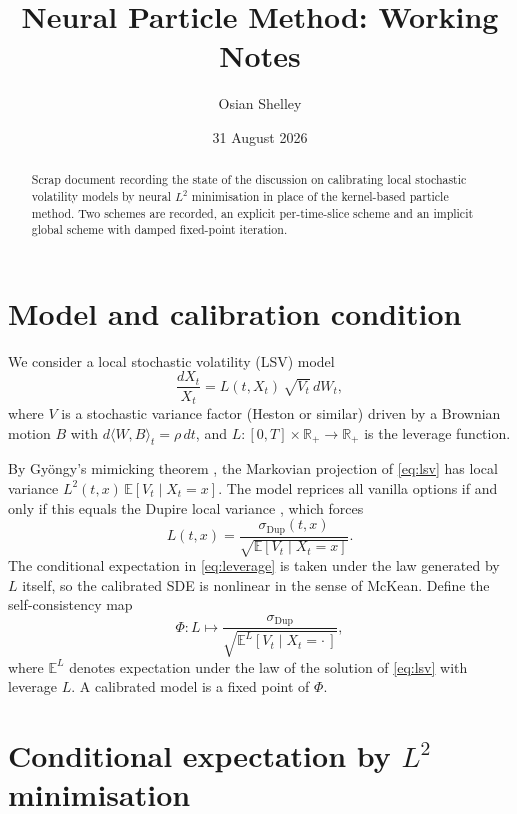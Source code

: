 \documentclass[11pt,a4paper]{article}
\title{Neural Particle Method: Working Notes}
\author{Osian Shelley}
\date{31 August 2026}
\theoremstyle{plain}
\theoremstyle{definition}
\theoremstyle{definition}
\newcommand{\E}{\mathbb{E}}
\newcommand{\R}{\mathbb{R}}
\newcommand{\sigDup}{\sigma_{\mathrm{Dup}}}
\newcommand{\Lev}{L}
\newcommand{\Phimap}{\Phi}
\begin{document}
\maketitle

\begin{abstract}
Scrap document recording the state of the discussion on calibrating local stochastic volatility models by neural $L^2$ minimisation in place of the kernel-based particle method. Two schemes are recorded, an explicit per-time-slice scheme and an implicit global scheme with damped fixed-point iteration.
\end{abstract}

\section{Model and calibration condition}\label{sec:setup}

We consider a local stochastic volatility (LSV) model
\begin{equation}\label{eq:lsv}
  \frac{dX_t}{X_t} = \Lev(t, X_t)\,\sqrt{V_t}\,dW_t,
\end{equation}
where $V$ is a stochastic variance factor (Heston or similar) driven by a Brownian motion $B$ with $d\langle W, B\rangle_t = \rho\,dt$, and $\Lev\colon [0,T]\times\R_+ \to \R_+$ is the leverage function.

By Gy\"ongy's mimicking theorem \citep{gyongy1986}, the Markovian projection of \cref{eq:lsv} has local variance $\Lev^2(t,x)\,\E[V_t \mid X_t = x]$. The model reprices all vanilla options if and only if this equals the Dupire local variance \citep{dupire1994}, which forces
\begin{equation}\label{eq:leverage}
  \Lev(t,x) = \frac{\sigDup(t,x)}{\sqrt{\E[V_t \mid X_t = x]}}.
\end{equation}
The conditional expectation in \cref{eq:leverage} is taken under the law generated by $\Lev$ itself, so the calibrated SDE is nonlinear in the sense of McKean. Define the self-consistency map
\begin{equation}\label{eq:phimap}
  \Phimap\colon \Lev \longmapsto
  \frac{\sigDup}{\sqrt{\E^{\Lev}[V_t \mid X_t = \cdot\,]}},
\end{equation}
where $\E^{\Lev}$ denotes expectation under the law of the solution of \cref{eq:lsv} with leverage $\Lev$. A calibrated model is a fixed point of $\Phimap$.

\section{Conditional expectation by $L^2$ minimisation}\label{sec:l2}
\end{document}
